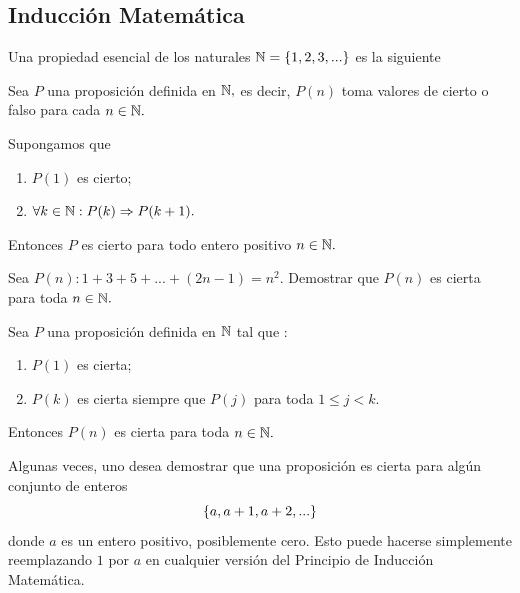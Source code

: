 \documentclass[xcolor={svgnames},
  hyperref={colorlinks}, 
  spanish, 12pt]{beamer}
\numberwithin{equation}{section} %
\numberwithin{figure}{section} %
\begin{document}
\subsection{Inducci\'on Matem\'atica}

\begin{frame}
 Una propiedad esencial de los naturales $\mathbb{N}=\left\{ 1,2,3,... \right\}$  es la siguiente
 \pause
 
 \begin{ax}
 Sea $P$ una proposici\'on definida en $\mathbb{N},$ es decir, $P(n)$ toma valores de cierto o falso para cada $n\in \mathbb{N}.$
 
 Supongamos que
 \begin{enumerate}
  \item $P(1)$ es cierto;
  \item $\forall k \in \mathbb{N}: P(k) \Rightarrow P(k+1).$
 \end{enumerate}

 Entonces $P$ es cierto para todo entero positivo $n\in \mathbb{N}.$
 \end{ax}

\end{frame}

\begin{frame}[t]
\begin{exmp}
 Sea $P(n):1+3+5+...+(2n-1)=n^2.$ Demostrar que $P(n)$ es cierta para toda $n \in \mathbb{N}.$ 
\end{exmp}
\end{frame}

\begin{frame}
 \begin{ax}
  Sea $P$ una proposici\'on definida en $\mathbb{N}$ tal que :
  \begin{enumerate}
   \item $P(1)$ es cierta;
   \item $P(k)$ es cierta siempre que $P(j)$ para toda $1\leq j < k.$
  \end{enumerate}
Entonces $P(n)$ es cierta para toda $n\in \mathbb{N}.$
 \end{ax}

\end{frame}

\begin{frame}
 \begin{rem}
  Algunas veces, uno desea demostrar que una proposici\'on es cierta para alg\'un conjunto de enteros
 $$
 \left\{ a,a+1, a+2,... \right\}
 $$
 donde $a$ es un entero positivo, posiblemente cero. Esto puede hacerse simplemente reemplazando $1$ por $a$ en cualquier versi\'on del Principio de Inducci\'on Matem\'atica. 
 \end{rem}

\end{frame}
\end{document}
